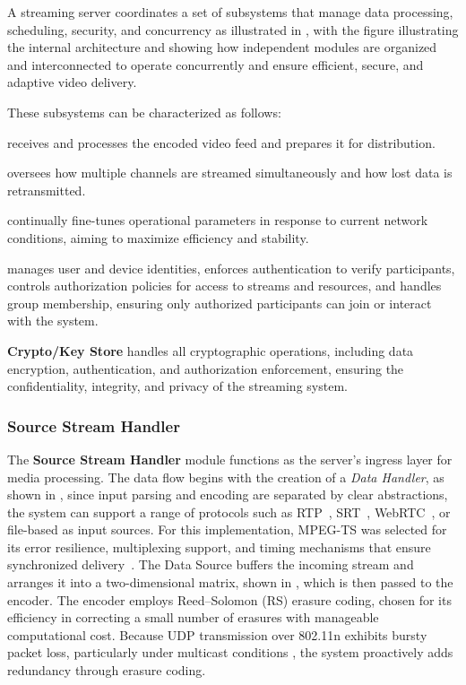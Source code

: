 \quad A streaming server coordinates a set of subsystems that manage data processing, scheduling, security, and concurrency as illustrated in \textbf{}, with the figure illustrating the internal architecture and showing how independent modules are organized and interconnected to operate concurrently and ensure efficient, secure, and adaptive video delivery. 

\quad These subsystems can be characterized as follows:

\begin{description}
	\item \textbf{} receives and processes the encoded video feed and prepares it for distribution.
	\item \textbf{} oversees how multiple channels are streamed simultaneously and how lost data is retransmitted.
	\item \textbf{} continually fine-tunes operational parameters in response to current network conditions, aiming to maximize efficiency and stability.
	\item \textbf{} manages user and device identities, enforces authentication to verify participants, controls authorization policies for access to streams and resources, and handles group membership, ensuring only authorized participants can join or interact with the system.
	\item \textbf{Crypto/Key Store} handles all cryptographic operations, including data encryption, authentication, and authorization enforcement, ensuring the confidentiality, integrity, and privacy of the streaming system.
\end{description}


\subsubsection{Source Stream Handler}
\label{sec:source stream handler}

\quad The \textbf{Source Stream Handler} module functions as the server’s ingress layer for media processing. The data flow begins with the creation of a \textit{Data Handler}, as shown in \textbf{}, since input parsing and encoding are separated by clear abstractions, the system can support a range of protocols such as RTP~\cite{schulzrinne1996rtp}, SRT~\cite{srt2021}, WebRTC~\cite{alvestrand2018rtc}, or file-based as input sources. For this implementation, MPEG-TS was selected for its error resilience, multiplexing support, and timing mechanisms that ensure synchronized delivery~\cite{castr_mpegts}. The Data Source buffers the incoming stream and arranges it into a two-dimensional matrix, shown in \textbf{}, which is then passed to the encoder. The encoder employs Reed–Solomon (RS) erasure coding, chosen for its efficiency in correcting a small number of erasures with manageable computational cost. Because UDP transmission over 802.11n exhibits bursty packet loss, particularly under multicast conditions \cite{80211n_loss}, the system proactively adds redundancy through erasure coding.

